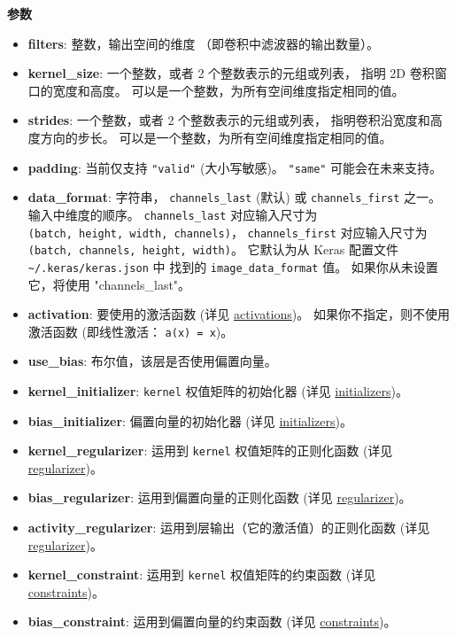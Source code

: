\textbf{参数}

\begin{itemize}
\tightlist
\item
  \textbf{filters}: 整数，输出空间的维度 （即卷积中滤波器的输出数量）。
\item
  \textbf{kernel\_size}: 一个整数，或者 2 个整数表示的元组或列表， 指明
  2D 卷积窗口的宽度和高度。 可以是一个整数，为所有空间维度指定相同的值。
\item
  \textbf{strides}: 一个整数，或者 2 个整数表示的元组或列表，
  指明卷积沿宽度和高度方向的步长。
  可以是一个整数，为所有空间维度指定相同的值。
\item
  \textbf{padding}: 当前仅支持 \texttt{"valid"} (大小写敏感)。
  \texttt{"same"} 可能会在未来支持。
\item
  \textbf{data\_format}: 字符串， \texttt{channels\_last} (默认) 或
  \texttt{channels\_first} 之一。 输入中维度的顺序。
  \texttt{channels\_last} 对应输入尺寸为
  \texttt{(batch,\ height,\ width,\ channels)}，
  \texttt{channels\_first} 对应输入尺寸为
  \texttt{(batch,\ channels,\ height,\ width)}。 它默认为从 Keras
  配置文件 \texttt{\textasciitilde{}/.keras/keras.json} 中 找到的
  \texttt{image\_data\_format} 值。 如果你从未设置它，将使用
  "channels\_last"。
\item
  \textbf{activation}: 要使用的激活函数 (详见
  \hyperref[activations]{activations})。
  如果你不指定，则不使用激活函数 (即线性激活： \texttt{a(x)\ =\ x})。
\item
  \textbf{use\_bias}: 布尔值，该层是否使用偏置向量。
\item
  \textbf{kernel\_initializer}: \texttt{kernel} 权值矩阵的初始化器 (详见
  \hyperref[initializers]{initializers})。
\item
  \textbf{bias\_initializer}: 偏置向量的初始化器 (详见
  \hyperref[initializers]{initializers})。
\item
  \textbf{kernel\_regularizer}: 运用到 \texttt{kernel}
  权值矩阵的正则化函数 (详见 \hyperref[regularizers]{regularizer})。
\item
  \textbf{bias\_regularizer}: 运用到偏置向量的正则化函数 (详见
  \hyperref[regularizers]{regularizer})。
\item
  \textbf{activity\_regularizer}: 运用到层输出（它的激活值）的正则化函数
  (详见 \hyperref[regularizers]{regularizer})。
\item
  \textbf{kernel\_constraint}: 运用到 \texttt{kernel} 权值矩阵的约束函数
  (详见 \hyperref[constraints]{constraints})。
\item
  \textbf{bias\_constraint}: 运用到偏置向量的约束函数 (详见
  \hyperref[constraints]{constraints})。
\end{itemize}

